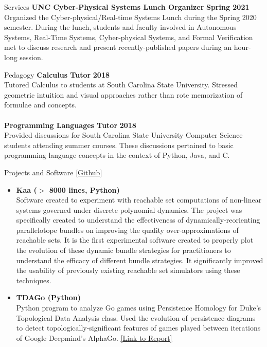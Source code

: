 \documentclass{resume} %
\begin{document}
\begin{rSection}{Services}
  {\bf UNC Cyber-Physical Systems Lunch Organizer} \hfill {\bf Spring 2021}\\
  Organized the Cyber-physical/Real-time Systems Lunch during the Spring 2020 semester. During the lunch, students and faculty involved in Autonomous Systems, Real-Time Systems, Cyber-physical Systems, and Formal Verification met to discuss research and present recently-published papers during an hour-long session.
\end{rSection}

\begin{rSection}{Pedagogy}
{\bf Calculus Tutor} \hfill {\bf 2018} \\
Tutored Calculus to students at South Carolina State University. Stressed geometric intuition and visual approaches rather than rote memorization of formulae and concepts. \\
\\
{\bf Programming Languages Tutor} \hfill {\bf 2018} \\
Provided discussions for South Carolina State University Computer Science students attending summer courses. These discussions pertained to basic programming language concepts in the context of Python, Java, and C. \\
\end{rSection}
\newpage

\begin{rSection}{Projects and Software [\href{https://github.com/ekim1919}{Github}]}
  \begin{itemize}
    \item {\bf Kaa ($>$ 8000 lines, Python)} \\
    Software created to experiment with reachable set computations of non-linear systems governed under discrete polynomial dynamics. The project was specifically created to understand the effectiveness of dynamically-reorienting parallelotope bundles on improving the quality over-approximations of reachable sets. It is the first experimental software created to properly plot the evolution of these dynamic bundle strategies for practitioners to understand the efficacy of different bundle strategies. It significantly improved the usability of previously existing reachable set simulators using these techniques.
    \item {\bf TDAGo (Python)} \\
    Python program to analyze Go games using Persistence Homology for Duke's Topological Data Analysis class. Used the evolution of persistence diagrams to detect topologically-significant features of games played between iterations of Google Deepmind's AlphaGo. \newline
    \href{https://github.com/ekim1919/TDAGo/blob/master/paper/final.pdf}{ [Link to Report] }
  \end{itemize}
\end{rSection}
\end{document}
